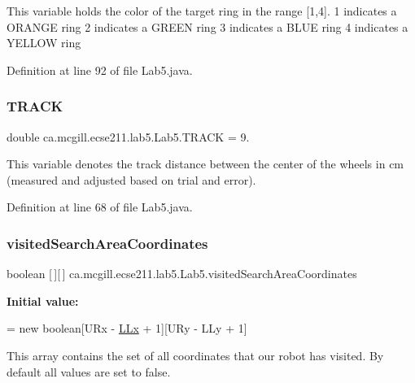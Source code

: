 This variable holds the color of the target ring in the range \mbox{[}1,4\mbox{]}. 1 indicates a O\+R\+A\+N\+GE ring 2 indicates a G\+R\+E\+EN ring 3 indicates a B\+L\+UE ring 4 indicates a Y\+E\+L\+L\+OW ring 

Definition at line 92 of file Lab5.\+java.

\mbox{\label{classca_1_1mcgill_1_1ecse211_1_1lab5_1_1_lab5_a401ed72b19795f01e72c8d2a69d9faba}} 
\subsubsection{\texorpdfstring{T\+R\+A\+CK}{TRACK}}
{\footnotesize\ttfamily double ca.\+mcgill.\+ecse211.\+lab5.\+Lab5.\+T\+R\+A\+CK = 9.\hspace{0.3cm}{\ttfamily [static]}}

This variable denotes the track distance between the center of the wheels in cm (measured and adjusted based on trial and error). 

Definition at line 68 of file Lab5.\+java.

\mbox{\label{classca_1_1mcgill_1_1ecse211_1_1lab5_1_1_lab5_a27ae00bb6fbeed54573af9cc5c3dc32e}} 
\subsubsection{\texorpdfstring{visited\+Search\+Area\+Coordinates}{visitedSearchAreaCoordinates}}
{\footnotesize\ttfamily boolean \mbox{[}$\,$\mbox{]}\mbox{[}$\,$\mbox{]} ca.\+mcgill.\+ecse211.\+lab5.\+Lab5.\+visited\+Search\+Area\+Coordinates\hspace{0.3cm}{\ttfamily [static]}}

{\bfseries Initial value\+:}
\begin{DoxyCode}
=
      \textcolor{keyword}{new} \textcolor{keywordtype}{boolean}[URx - \hyperlink{classca_1_1mcgill_1_1ecse211_1_1lab5_1_1_lab5_a957a526ed669e9d8b7fc485e21385ee9}{LLx} + 1][URy - LLy + 1]
\end{DoxyCode}
This array contains the set of all coordinates that our robot has visited. By default all values are set to false. 

